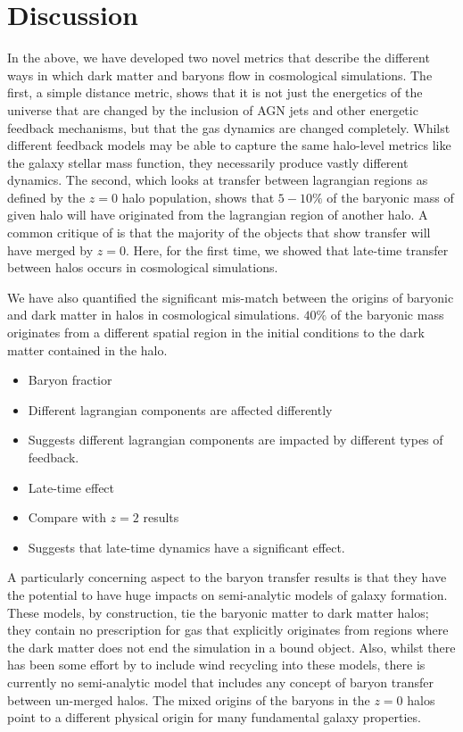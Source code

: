 \section{Discussion}
\label{sec:conclusions}

In the above, we have developed two novel metrics that describe the different
ways in which dark matter and baryons flow in cosmological simulations. The
first, a simple distance metric, shows that it is not just the energetics of
the universe that are changed by the inclusion of AGN jets and other energetic
feedback mechanisms, but that the gas dynamics are changed completely. Whilst
different feedback models may be able to capture the same halo-level metrics
like the galaxy stellar mass function, they necessarily produce vastly
different dynamics. The second, which looks at transfer between lagrangian
regions as defined by the $z=0$ halo population, shows that $5-10\%$ of the
baryonic mass of given halo will have originated from the lagrangian region
of another halo. A common critique of \citet{AnglesAlcazar2017} is that the
majority of the objects that show transfer will have merged by $z=0$. Here,
for the first time, we showed that late-time transfer between halos occurs
in cosmological simulations.

We have also quantified the significant mis-match between the origins of
baryonic and dark matter in halos in cosmological simulations. $40\%$ of the
baryonic mass originates from a different spatial region in the initial
conditions to the dark matter contained in the halo.

\begin{itemize}
    \item Baryon fractior
    \item Different lagrangian components are affected differently
    \item Suggests different lagrangian components are impacted by different
          types of feedback.
\end{itemize}

\begin{itemize}
    \item Late-time effect
    \item Compare with $z=2$ results
    \item Suggests that late-time dynamics have a significant effect.
\end{itemize}

A particularly concerning aspect to the baryon transfer results is that they
have the potential to have huge impacts on semi-analytic models of galaxy
formation. These models, by construction, tie the baryonic matter to dark
matter halos; they contain no prescription for gas that explicitly originates
from regions where the dark matter does not end the simulation in a bound
object. Also, whilst there has been some effort by \citet{Henriques2015,
SomebodyElse} to include wind recycling into these models, there is currently
no semi-analytic model that includes any concept of baryon transfer between
un-merged halos. The mixed origins of the baryons in the $z=0$ halos
point to a different physical origin for many fundamental galaxy properties.

